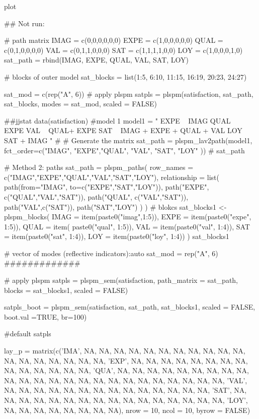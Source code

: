 \documentclass[a4paper]{book}
\begin{document}
\begin{Value}
plot
\end{Value}
%
\begin{Examples}
\begin{ExampleCode}
\#\# Not run: 

# path matrix
IMAG = c(0,0,0,0,0,0)
EXPE = c(1,0,0,0,0,0)
QUAL = c(0,1,0,0,0,0)
VAL = c(0,1,1,0,0,0)
SAT = c(1,1,1,1,0,0)
LOY = c(1,0,0,0,1,0)
sat_path = rbind(IMAG, EXPE, QUAL, VAL, SAT, LOY)

# blocks of outer model
sat_blocks = list(1:5, 6:10, 11:15, 16:19, 20:23, 24:27)

sat_mod = c(rep("A", 6))
# apply plspm
satpls = plspm(satisfaction, sat_path, sat_blocks, modes = sat_mod,
               scaled = FALSE)


 ##jjstat
data(satisfaction)
#model 1
model1 = "
EXPE ~ IMAG
QUAL ~ EXPE
VAL ~  QUAL+ EXPE
SAT ~ IMAG + EXPE + QUAL + VAL
LOY ~ SAT + IMAG
"
# # Generate the matrix
sat_path = plspm_lav2path(model1,
                          fct_order=c("IMAG", "EXPE","QUAL", "VAL", "SAT", "LOY" ))
# sat_path

# Method 2: paths
sat_path = plspm_paths(
  row_names = c("IMAG","EXPE","QUAL","VAL","SAT","LOY"),
  relationship = list(
    path(from="IMAG", to=c("EXPE","SAT","LOY")),
    path("EXPE", c("QUAL","VAL","SAT")),
    path("QUAL", c("VAL","SAT")),
    path("VAL",c("SAT")),
    path("SAT","LOY")
  )
)
# blokcs
sat_blocks1 <- plspm_blocks(
  IMAG = item(paste0("imag",1:5)),
  EXPE = item(paste0("expe", 1:5)),
  QUAL = item( paste0("qual", 1:5)),
  VAL = item(paste0("val", 1:4)),
  SAT = item(paste0("sat", 1:4)),
  LOY = item(paste0("loy", 1:4))
)
sat_blocks1

# vector of modes (reflective indicators):auto
sat_mod = rep("A", 6)
#############

# apply plspm
satpls = plspm_sem(satisfaction,
                   path_matrix = sat_path,
                   blocks = sat_blocks1,
                   scaled = FALSE)

satpls_boot = plspm_sem(satisfaction, sat_path, sat_blocks1, scaled = FALSE,
                        boot.val =TRUE, br=100)

#default
satpls %



lay_p = matrix(c('IMA', NA, NA, NA, NA, NA, NA,
 NA, NA, NA, NA, NA, NA, NA, NA, NA, NA, NA, NA,
 'EXP', NA, NA, NA, NA, NA, NA, NA, NA, NA, NA,
 NA, NA, NA, NA, 'QUA', NA, NA, NA, NA, NA, NA,
 NA, NA, NA, NA, NA, NA, NA, NA, NA, NA, NA, NA,
 NA, NA, NA, NA, NA, NA, 'VAL', NA, NA, NA, NA,
 NA, NA, NA, NA, NA, NA, NA, NA, NA, NA, 'SAT',
 NA, NA, NA, NA, NA, NA, NA, NA, NA, NA, NA, NA,
 NA, NA, NA, NA, 'LOY', NA, NA, NA, NA, NA, NA, NA, NA),
 nrow = 10, ncol = 10, byrow = FALSE)


\end{ExampleCode}
\end{Examples}
\end{document}
